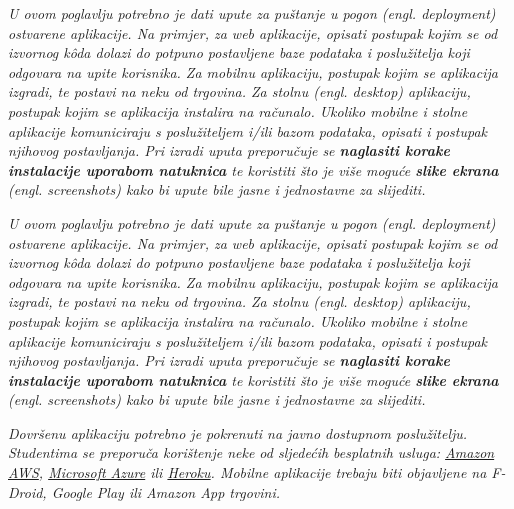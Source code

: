 			\textit{U ovom poglavlju potrebno je dati upute za puštanje u pogon (engl. deployment) ostvarene aplikacije. Na primjer, za web aplikacije, opisati postupak kojim se od izvornog kôda dolazi do potpuno postavljene baze podataka i poslužitelja koji odgovara na upite korisnika. Za mobilnu aplikaciju, postupak kojim se aplikacija izgradi, te postavi na neku od trgovina. Za stolnu (engl. desktop) aplikaciju, postupak kojim se aplikacija instalira na računalo. Ukoliko mobilne i stolne aplikacije komuniciraju s poslužiteljem i/ili bazom podataka, opisati i postupak njihovog postavljanja. Pri izradi uputa preporučuje se \textbf{naglasiti korake instalacije uporabom natuknica} te koristiti što je više moguće \textbf{slike ekrana} (engl. screenshots) kako bi upute bile jasne i jednostavne za slijediti.}
		
			 \textit{U ovom poglavlju potrebno je dati upute za puštanje u pogon (engl. deployment) ostvarene aplikacije. Na primjer, za web aplikacije, opisati postupak kojim se od izvornog kôda dolazi do potpuno postavljene baze podataka i poslužitelja koji odgovara na upite korisnika. Za mobilnu aplikaciju, postupak kojim se aplikacija izgradi, te postavi na neku od trgovina. Za stolnu (engl. desktop) aplikaciju, postupak kojim se aplikacija instalira na računalo. Ukoliko mobilne i stolne aplikacije komuniciraju s poslužiteljem i/ili bazom podataka, opisati i postupak njihovog postavljanja. Pri izradi uputa preporučuje se \textbf{naglasiti korake instalacije uporabom natuknica} te koristiti što je više moguće \textbf{slike ekrana} (engl. screenshots) kako bi upute bile jasne i jednostavne za slijediti.}
			
			
			 \textit{Dovršenu aplikaciju potrebno je pokrenuti na javno dostupnom poslužitelju. Studentima se preporuča korištenje neke od sljedećih besplatnih usluga: \href{https://aws.amazon.com/}{Amazon AWS}, \href{https://azure.microsoft.com/en-us/}{Microsoft Azure} ili \href{https://www.heroku.com/}{Heroku}. Mobilne aplikacije trebaju biti objavljene na F-Droid, Google Play ili Amazon App trgovini.}
			
			
			\eject 